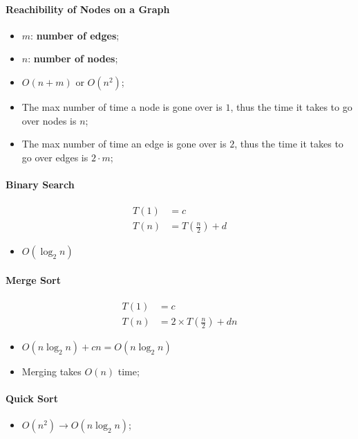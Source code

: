 \documentclass[letterpaper, 11pt]{article}
\begin{document}
      \paragraph{Reachibility of Nodes on a Graph}
      \begin{itemize}
        \item $ m $: \textbf{number of edges};
        \item $ n $: \textbf{number of nodes};
        \item $ O \left( n + m \right) $ or $ O \left( n^{2} \right) $;
        \item The max number of time a node is gone over is $ 1 $, thus the time
        it takes to go over nodes is $ n $;
        \item The max number of time an edge is gone over is $ 2 $, thus the time 
        it takes to go over edges is $ 2 \cdot m $;
      \end{itemize}
      
      \paragraph{Binary Search}
      \begin{align*}
        T \left( 1 \right) &= c \\ 
        T \left( n \right) &= T \left( \frac{n}{2} \right) + d
      \end{align*}
      \begin{itemize}
        \item $ O \left( \log_{2} n \right) $
      \end{itemize}
      
      \paragraph{Merge Sort}
      \begin{align*}
        T \left( 1 \right) &= c \\ 
        T \left( n \right) &= 2 \times T \left( \frac{n}{2} \right) + dn
      \end{align*}
      \begin{itemize}
        \item $ O \left( n \log_{2} n \right) + cn = O \left( n \log_{2} n \right) $
        \item Merging takes $ O \left( n \right) $ time;
      \end{itemize}
      
      \paragraph{Quick Sort}
      \begin{itemize}
        \item $ O \left( n^{2} \right) \to O \left( n \log_{2} n \right) $;
      \end{itemize}
      
\end{document}
